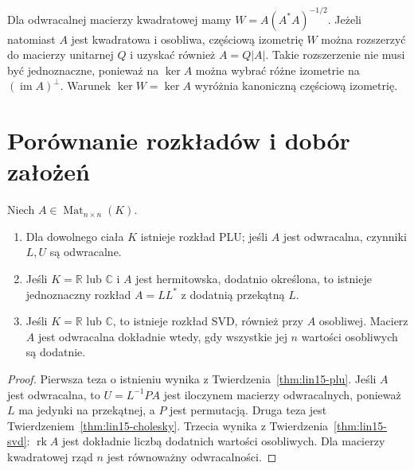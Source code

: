 \begin{uwaga}
\label{rem:lin15-polar-unitary}
Dla odwracalnej macierzy
kwadratowej mamy
\(W=A(A^*A)^{-1/2}\).
Jeżeli natomiast \(A\)
jest kwadratowa i osobliwa,
częściową izometrię \(W\)
można rozszerzyć do macierzy
unitarnej \(Q\) i uzyskać
również \(A=Q|A|\).
Takie rozszerzenie
nie musi być jednoznaczne,
ponieważ na \(\ker A\)
można wybrać różne izometrie
na \((\operatorname{im}A)^\perp\).
Warunek \(\ker W=\ker A\)
wyróżnia kanoniczną
częściową izometrię.
\end{uwaga}

\section{Porównanie rozkładów i dobór założeń}
\label{sec:lin15-porownanie}

\begin{stwierdzenie}
\label{prop:lin15-summary}
Niech \(A\in\operatorname{Mat}_{n\times n}(K)\).
\begin{enumerate}[label=(\roman*)]
\item Dla dowolnego ciała \(K\)
      istnieje rozkład PLU;
      jeśli \(A\) jest odwracalna,
      czynniki \(L,U\) są odwracalne.
\item Jeśli \(K=\mathbb R\) lub \(\mathbb C\)
      i \(A\) jest hermitowska,
      dodatnio określona, to
      istnieje jednoznaczny
      rozkład \(A=LL^*\)
      z dodatnią przekątną \(L\).
\item Jeśli \(K=\mathbb R\) lub \(\mathbb C\),
      to istnieje rozkład SVD,
      również przy \(A\) osobliwej.
      Macierz \(A\) jest odwracalna
      dokładnie wtedy, gdy wszystkie
      jej \(n\) wartości osobliwych
      są dodatnie.
\end{enumerate}
\end{stwierdzenie}
\begin{proof}
Pierwsza teza o istnieniu
wynika z
Twierdzenia~\ref{thm:lin15-plu}.
Jeśli \(A\) jest odwracalna,
to \(U=L^{-1}PA\)
jest iloczynem macierzy
odwracalnych, ponieważ
\(L\) ma jedynki na przekątnej,
a \(P\) jest permutacją.
Druga teza jest
Twierdzeniem~\ref{thm:lin15-cholesky}.
Trzecia wynika z
Twierdzenia~\ref{thm:lin15-svd}:
\(\operatorname{rk}A\)
jest dokładnie liczbą dodatnich
wartości osobliwych.
Dla macierzy kwadratowej
rząd \(n\) jest równoważny
odwracalności.
\end{proof}


